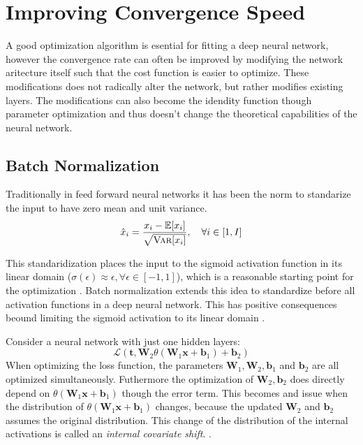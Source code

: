 \section{Improving Convergence Speed}
\label{sec:convergence}

A good optimization algorithm is esential for fitting a deep neural network, however the convergence rate can often be improved by modifying the network aritecture itself such that the cost function is easier to optimize. These modifications does not radically alter the network, but rather modifies existing layers. The modifications can also become the idendity function though parameter optimization and thus doesn't change the theoretical capabilities of the neural network.

\subsection{Batch Normalization}
Traditionally in feed forward neural networks it has been the norm to standarize the input to have zero mean and unit variance.
\begin{equation}
\hat{x}_i = \frac{x_i - \mathbb{E}[x_i]}{\sqrt{\textsc{Var}[x_i]}}, \quad \forall i \in [1, I]
\end{equation}

This standaridization places the input to the sigmoid activation function in its linear domain ($\sigma(\epsilon) \approx \epsilon, \forall \epsilon \in [-1, 1]$), which is a reasonable starting point for the optimization . Batch normalization extends this idea to standardize before all activation functions in a deep neural network. This has positive consequences beound limiting the sigmoid activation to its linear domain \cite{batch-normalization}.

Consider a neural network with just one hidden layers:
\begin{equation}
\mathcal{L}(\mathbf{t}, \mathbf{W}_2 \theta(\mathbf{W}_1 \mathbf{x} + \mathbf{b}_1) + \mathbf{b}_2)
\end{equation}
When optimizing the loss function, the parameters $\mathbf{W}_1, \mathbf{W}_2, \mathbf{b}_1$ and $\mathbf{b}_2$ are all optimized simultaneously. Futhermore the optimization of $\mathbf{W}_2, \mathbf{b}_2$ does directly depend on $\theta(\mathbf{W}_1 \mathbf{x} + \mathbf{b}_1)$ though the error term. This becomes and issue when the distribution of $\theta(\mathbf{W}_1 \mathbf{x} + \mathbf{b}_1)$ changes, because the updated $\mathbf{W}_2$ and $\mathbf{b}_2$ assumes the original distribution. This change of the distribution of the internal activations is called an \textit{internal covariate shift}. \cite{batch-normalization}.

